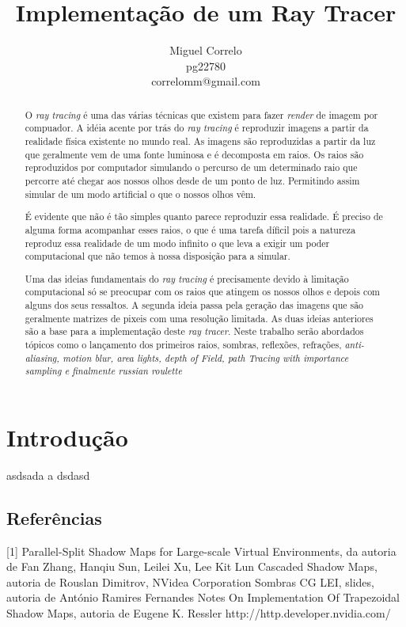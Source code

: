 \documentclass[12pt]{article}
\title{Implementação de um Ray Tracer}
\author{Miguel Correlo \\
\small{pg22780}\\
\small{correlomm@gmail.com}}
\begin{document}
\maketitle

\begin{abstract}
O {\it ray tracing} é uma das várias técnicas que existem para fazer {\it render} de imagem por compuador. A idéia acente por trás do {\it ray tracing} é reproduzir imagens a partir da realidade física existente no mundo real. As imagens são reproduzidas a partir da luz que geralmente vem de uma fonte luminosa e é decomposta em raios. Os raios são reproduzidos por computador simulando o percurso de um determinado raio que percorre até chegar aos nossos olhos desde de um ponto de luz. Permitindo assim simular de um modo artificial o que o nossos olhos vêm.

É evidente que não é tão simples quanto parece reproduzir essa realidade. É preciso de alguma forma acompanhar esses raios, o que é uma tarefa díficil pois a natureza reproduz essa realidade de um modo infinito o que leva a exigir um poder computacional que não temos à nossa disposição para a simular.

Uma das ideias fundamentais do {\it ray tracing} é precisamente devido à limitação computacional só se preocupar com os raios que atingem os nossos olhos e depois com alguns dos seus ressaltos. A segunda ideia passa pela geração das imagens que são geralmente matrizes de pixeis com uma resolução limitada. As duas ideias anteriores são a base para a implementação deste {\it ray tracer}. Neste trabalho serão abordados tópicos como o lançamento dos primeiros raios, sombras, reflexões, refrações, {\it anti-aliasing, motion blur, area lights, depth of Field, path Tracing with importance sampling e finalmente russian roulette}


\end{abstract}

\section{Introdução}
\vspace{10 mm}
\hspace{8 mm} asdsada a dsdasd


\subsection{Referências}

[1] Parallel-Split Shadow Maps for Large-scale Virtual Environments, da autoria de Fan Zhang, Hanqiu Sun, Leilei Xu, Lee Kit Lun \newline
[2] Cascaded Shadow Maps, autoria de Rouslan Dimitrov, NVidea Corporation \newline
[3] Sombras CG LEI, slides, autoria de António Ramires Fernandes \newline
[4] Notes On Implementation Of Trapezoidal Shadow Maps, autoria de Eugene K. Ressler \newline
[5] http://http.developer.nvidia.com/ \newline
\end{document}
